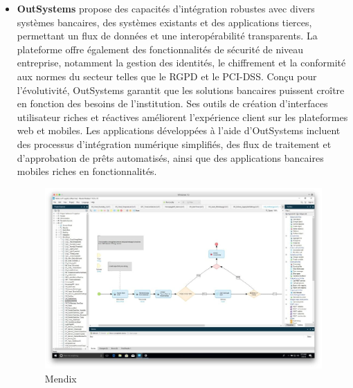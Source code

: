 \begin{itemize}

\item \textbf{OutSystems} propose des capacités d'intégration robustes avec divers systèmes bancaires, des systèmes existants et des applications tierces, permettant un flux de données et une interopérabilité transparents. La plateforme offre également des fonctionnalités de sécurité de niveau entreprise, notamment la gestion des identités, le chiffrement et la conformité aux normes du secteur telles que le RGPD et le PCI-DSS. Conçu pour l'évolutivité, OutSystems garantit que les solutions bancaires puissent croître en fonction des besoins de l'institution. Ses outils de création d'interfaces utilisateur riches et réactives améliorent l'expérience client sur les plateformes web et mobiles. Les applications développées à l'aide d'OutSystems incluent des processus d'intégration numérique simplifiés, des flux de traitement et d'approbation de prêts automatisés, ainsi que des applications bancaires mobiles riches en fonctionnalités.



\begin{figure}[H] 
    \centering
    \includegraphics[width=15cm]{Figures/mendix.jpg}
    \caption{Mendix}
    \label{fig:my_label} %
\end{figure}



\end{itemize}
